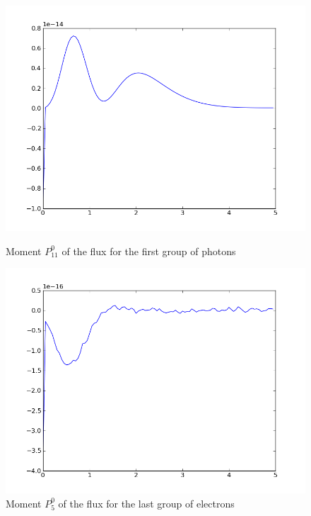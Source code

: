 \begin{figure}[H]
\begin{minipage}[b]{0.45\linewidth}
\centering
\includegraphics[width=\linewidth]{./images/al/group_0_moment_142}
\caption{Moment $P_{11}^0$ of the flux for the first group of photons}
\end{minipage}
\hspace{0.5cm}
\begin{minipage}[b]{0.45\linewidth}
\centering
\includegraphics[width=\linewidth]{./images/al/group_39_moment_142}
\caption{Moment $P_5^0$ of the flux for the last group of electrons}
\end{minipage}
\end{figure}

